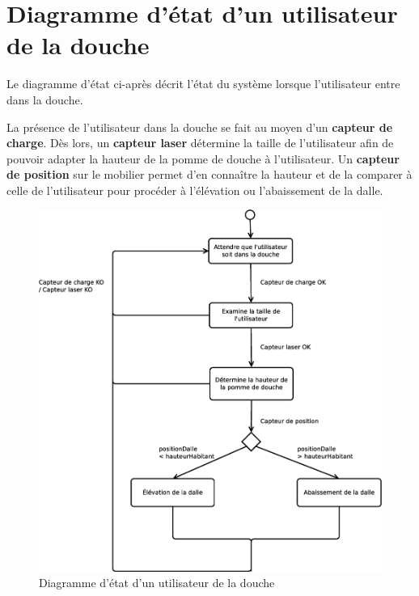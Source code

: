 \section{Diagramme d'état d'un utilisateur de la douche}
Le diagramme d'état ci-après décrit l'état du système lorsque l'utilisateur entre dans la douche. 

La présence de l'utilisateur dans la douche se fait au moyen d'un \textbf{capteur de charge}. Dès lors, un \textbf{capteur laser} détermine la taille de l'utilisateur afin de pouvoir adapter la hauteur de la pomme de douche à l'utilisateur. Un \textbf{capteur de position} sur le mobilier permet d'en connaître la hauteur et de la comparer à celle de l'utilisateur pour procéder à l'élévation ou l'abaissement de la dalle. 
\begin{figure}[H]
	\centering
	\includegraphics[width=1\linewidth]{diagrams/bathroom/diagramme_etat_st2.eps}
	\caption{Diagramme d'état d'un utilisateur de la douche}
	\label{fig:diagramme_st2}
\end{figure}
